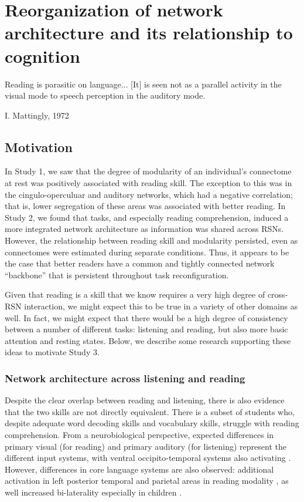 \chapter{Reorganization of network architecture and its relationship to cognition}

\epigraph{Reading is parasitic on language... [It] is seen not as a parallel activity in the visual mode to speech perception in the auditory mode.}{I. Mattingly, 1972 \citep{Mattingly1971}}

\section{Motivation}

In Study 1, we saw that the degree of modularity of an individual's connectome at rest was positively associated with reading skill. The exception to this was in the cingulo-operculuar and auditory networks, which had a negative correlation; that is, lower segregation of these areas was associated with better reading. In Study 2, we found that tasks, and especially reading comprehension, induced a more integrated network architecture as information was shared across RSNs. However, the relationship between reading skill and modularity persisted, even as connectomes were estimated during separate conditions. Thus, it appears to be the case that better readers have a common and tightly connected network ``backbone'' that is persistent throughout task reconfiguration.

Given that reading is a skill that we know requires a very high degree of cross-RSN interaction, we might expect this to be true in a variety of other domains as well. In fact, we might expect that there would be a high degree of consistency between a number of different tasks: listening and reading, but also more basic attention and resting states. Below, we describe some research supporting these ideas to motivate Study 3.

\subsection{Network architecture across listening and reading}

Despite the clear overlap between reading and listening, there is also evidence that the two skills are not directly equivalent. There is a subset of students who, despite adequate word decoding skills and vocabulary skills, struggle with reading comprehension\citep{Pimperton2010, Spencer2014}. From a neurobiological perspective, expected differences in primary visual (for reading) and primary auditory (for listening) represent the different input systems, with ventral occipito-temporal systems also activating \citep{Jobard2007}. However, differences in core language systems are also observed: additional activation in left posterior temporal and parietal areas in reading modality \citep{Constable2004}, as well increased bi-laterality especially in children \citep{Berl2011}. 

